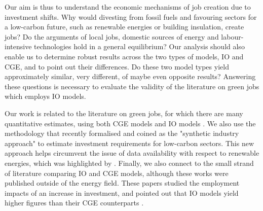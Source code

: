 Our aim is thus to understand the economic mechanisms of job creation due to investment shifts. Why would divesting from fossil fuels and favouring sectors for a low-carbon future, such as renewable energies or building insulation, create jobs? Do the arguments of local jobs, domestic sources of energy and labour-intensive technologies hold in a general equilibrium?
Our analysis should also enable us to determine robust results across the two types of models, IO and CGE, and to point out their differences. Do these two model types yield approximately similar, very different, of maybe even opposite results? Answering these questions is necessary to evaluate the validity of the literature on green jobs which employs IO models.

Our work is related to the literature on green jobs, for which there are many quantitative estimates, using both CGE models \citep{Lehr2008, Lehr2012, Bohringer2013, Blazejczak2014, Creutzig2014, Duscha2014, Duscha2016, Chen2016} and IO models \citep{Hillebrand2006, Scott2008, deArce2012, Markaki2013, Hartwig2016, Yushchenko2016, Li2016, Garrett2017}.
We also use the methodology that \citet{Garrett2017} recently formalised and coined as the "synthetic industry approach" to estimate investment requirements for low-carbon sectors. This new approach helps circumvent the issue of data availability with respect to renewable energies, which was highlighted by \citet{Cameron2015}.
Finally, we also connect to the small strand of literature comparing IO and CGE models, although these works were published outside of the energy field. These papers studied the employment impacts of an increase in investment, and pointed out that IO models yield higher figures than their CGE counterparts \citep{Partridge1998, OHara2013, Dwyer2005}.

